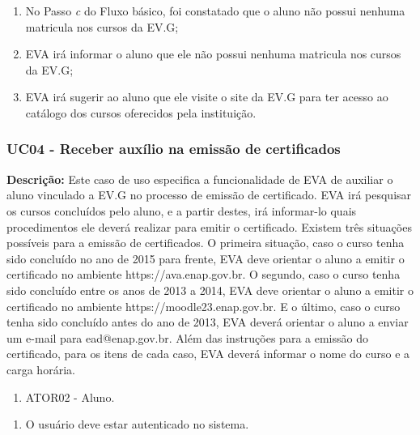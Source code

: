     \begin{enumerate}[label=\alph*)]
        \tightlist
        \item No Passo \textit{c} do Fluxo básico, foi constatado que o aluno não possui nenhuma matricula nos cursos da EV.G;
        \item EVA irá informar o aluno que ele não possui nenhuma matricula nos cursos da EV.G;
        \item EVA irá sugerir ao aluno que ele visite o site da EV.G para ter acesso ao catálogo dos cursos oferecidos pela instituição.
    \end{enumerate}


\subsubsection{UC04 - Receber auxílio na emissão de certificados}

\textbf{Descrição:} Este caso de uso especifica a funcionalidade de EVA de auxiliar o aluno vinculado a EV.G no processo de emissão de certificado. EVA irá pesquisar os cursos concluídos pelo aluno, e a partir destes, irá informar-lo quais procedimentos ele deverá realizar para emitir o certificado. Existem três situações possíveis para a emissão de certificados. O primeira situação, caso o curso tenha sido concluído no ano de 2015 para frente, EVA deve orientar o aluno a emitir o certificado no ambiente https://ava.enap.gov.br. O segundo, caso o curso tenha sido concluído entre os anos de 2013 a 2014, EVA deve orientar o aluno a emitir o certificado no ambiente https://moodle23.enap.gov.br. E o último, caso o curso tenha sido concluído antes do ano de 2013, EVA deverá orientar o aluno a enviar um e-mail para ead@enap.gov.br. Além das instruções para a emissão do certificado, para os itens de cada caso, EVA deverá informar o nome do curso e a carga horária.

    \begin{enumerate}[label=\alph*)]
        \tightlist
        \item ATOR02 - Aluno.
    \end{enumerate}
        
    \begin{enumerate}[label=\alph*)]
        \tightlist
        \item O usuário deve estar autenticado no sistema.
    \end{enumerate}
        
